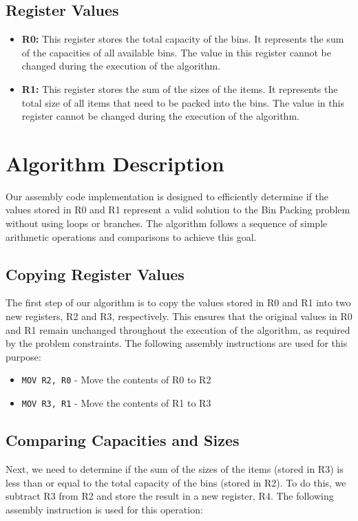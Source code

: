\subsection{Register Values}
\begin{itemize}
    \item \textbf{R0:} This register stores the total capacity of the bins. It represents the sum of the capacities of all available bins. The value in this register cannot be changed during the execution of the algorithm.
    \item \textbf{R1:} This register stores the sum of the sizes of the items. It represents the total size of all items that need to be packed into the bins. The value in this register cannot be changed during the execution of the algorithm.
\end{itemize}

\section{Algorithm Description}
Our assembly code implementation is designed to efficiently determine if the values stored in R0 and R1 represent a valid solution to the Bin Packing problem without using loops or branches. The algorithm follows a sequence of simple arithmetic operations and comparisons to achieve this goal. 

\subsection{Copying Register Values}
The first step of our algorithm is to copy the values stored in R0 and R1 into two new registers, R2 and R3, respectively. This ensures that the original values in R0 and R1 remain unchanged throughout the execution of the algorithm, as required by the problem constraints. The following assembly instructions are used for this purpose:

\begin{itemize}
    \item \texttt{MOV R2, R0} - Move the contents of R0 to R2
    \item \texttt{MOV R3, R1} - Move the contents of R1 to R3
\end{itemize}

\subsection{Comparing Capacities and Sizes}
Next, we need to determine if the sum of the sizes of the items (stored in R3) is less than or equal to the total capacity of the bins (stored in R2). To do this, we subtract R3 from R2 and store the result in a new register, R4. The following assembly instruction is used for this operation:

